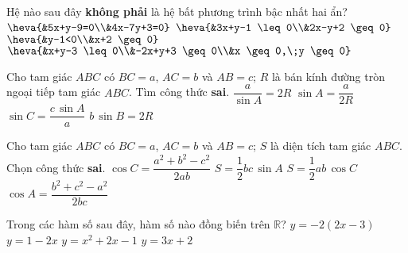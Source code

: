 	\begin{ex}%
		Hệ nào sau đây \textbf{không phải} là hệ bất phương trình bậc nhất hai ẩn?
		\choice
		{\True $\heva{&5x+y-9=0\\&4x-7y+3=0}$}
		{$\heva{&3x+y-1 \leq 0\\&2x-y+2 \geq 0}$}
		{$\heva{&y-1<0\\&x+2 \geq 0}$}
		{$\heva{&x+y-3 \leq 0\\&-2x+y+3 \geq 0\\&x \geq 0,\;y \geq 0}$}
	\end{ex}

	\begin{ex}%
		Cho tam giác $ABC$ có $BC=a$, $AC=b$ và $AB=c$; $R$ là bán kính đường tròn ngoại tiếp tam giác $ABC$. Tìm công thức \textbf{sai}.
		\choice
		{$\dfrac{a}{\sin A}=2R$}
		{$\sin A=\dfrac{a}{2R}$}
		{$\sin C=\dfrac{c\,\sin A}{a}$}
		{\True $b\,\sin B=2R$}
	\end{ex}

	\begin{ex}%
		Cho tam giác $ABC$ có $BC=a$, $AC=b$ và $AB=c$; $S$ là diện tích tam giác $ABC$. Chọn công thức \textbf{sai}.
		\choice
		{$\cos C=\dfrac{a^2+b^2-c^2}{2ab}$}
		{$S=\dfrac{1}{2}bc\,\sin A$}
		{\True $S=\dfrac{1}{2}ab\,\cos C$}
		{$\cos A=\dfrac{b^2+c^2-a^2}{2bc}$}
	\end{ex}

	\begin{ex}%
		Trong các hàm số sau đây, hàm số nào đồng biến trên $\mathbb{R}$?
		\choice
		{$y=-2(2x-3)$}
		{$y=1-2x$}
		{$y=x^2+2x-1$}
		{\True $y=3x+2$}
	\end{ex}



